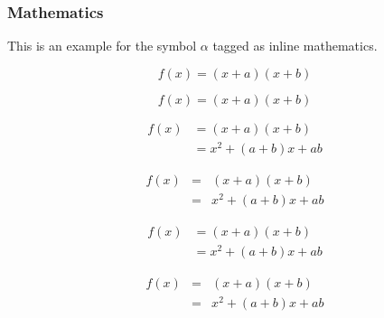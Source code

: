 \documentclass[preprint,12pt]{elsarticle}
\begin{document}
\subsubsection{Mathematics}
This is an example for the symbol $\alpha$ tagged as inline mathematics.

\begin{equation}
f(x) = (x+a)(x+b)
\end{equation}

\begin{equation*}
f(x) = (x+a)(x+b)
\end{equation*}

\begin{align}
 f(x) &= (x+a)(x+b) \\
      &= x^2 + (a+b)x + ab
\end{align}

\begin{eqnarray}
 f(x) &=& (x+a)(x+b) \nonumber\\ %
      &=& x^2 + (a+b)x + ab
\end{eqnarray}

\begin{align*}
 f(x) &= (x+a)(x+b) \\
      &= x^2 + (a+b)x + ab
\end{align*}

\begin{eqnarray*}
 f(x)&=& (x+a)(x+b) \\
     &=& x^2 + (a+b)x + ab
\end{eqnarray*}

\end{document}
